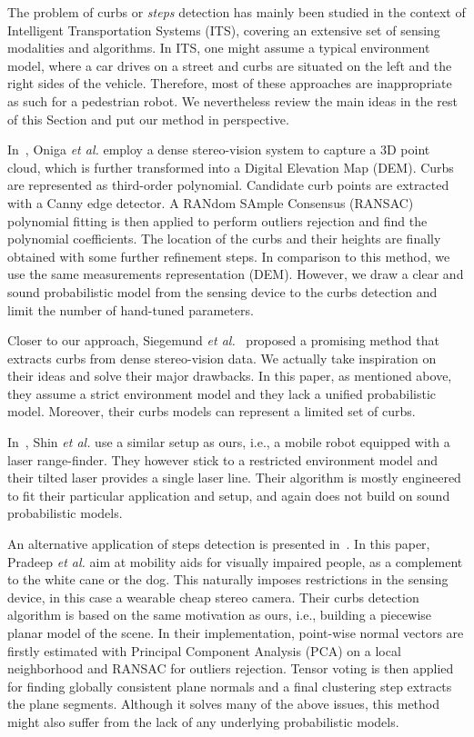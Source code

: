 The problem of curbs or \emph{steps} detection has mainly been studied in the
context of Intelligent Transportation Systems (ITS), covering an extensive set
of sensing modalities and algorithms. In ITS, one might assume a typical
environment model, where a car drives on a street and curbs are situated on the
left and the right sides of the vehicle. Therefore, most of these approaches are
inappropriate as such for a pedestrian robot. We nevertheless review the main
ideas in the rest of this Section and put our method in perspective.

In~\cite{oniga10polynomial}, Oniga \emph{et al.} employ a dense stereo-vision
system to capture a 3D point cloud, which is further transformed into a Digital
Elevation Map (DEM). Curbs are represented as third-order polynomial. Candidate
curb points are extracted with a Canny edge detector. A RANdom SAmple Consensus
(RANSAC) polynomial fitting is then applied to perform outliers rejection and
find the polynomial coefficients. The location of the curbs and their heights
are finally obtained with some further refinement steps. In comparison to this
method, we use the same measurements representation (DEM). However, we draw a
clear and sound probabilistic model from the sensing device to the curbs
detection and limit the number of hand-tuned parameters.

Closer to our approach, Siegemund \emph{et al.}~\cite{siegemund10curb} proposed
a promising method that extracts curbs from dense stereo-vision data. We
actually take inspiration on their ideas and solve their major drawbacks. In
this paper, as mentioned above, they assume a strict environment model and they
lack a unified probabilistic model. Moreover, their curbs models can represent a
limited set of curbs.

In~\cite{shin10drivable}, Shin \emph{et al.} use a similar setup as ours, i.e.,
a mobile robot equipped with a laser range-finder. They however stick to a
restricted environment model and their tilted laser provides a single laser
line. Their algorithm is mostly engineered to fit their particular application
and setup, and again does not build on sound probabilistic models.

An alternative application of steps detection is presented
in~\cite{pradeep08piece}. In this paper, Pradeep \emph{et al.} aim at mobility
aids for visually impaired people, as a complement to the white cane or the dog.
This naturally imposes restrictions in the sensing device, in this case a
wearable cheap stereo camera. Their curbs detection algorithm is based on the
same motivation as ours, i.e., building a piecewise planar model of the scene.
In their implementation, point-wise normal vectors are firstly estimated with
Principal Component Analysis (PCA) on a local neighborhood and RANSAC for
outliers rejection. Tensor voting is then applied for finding globally
consistent plane normals and a final clustering step extracts the plane
segments. Although it solves many of the above issues, this method might also
suffer from the lack of any underlying probabilistic models.

